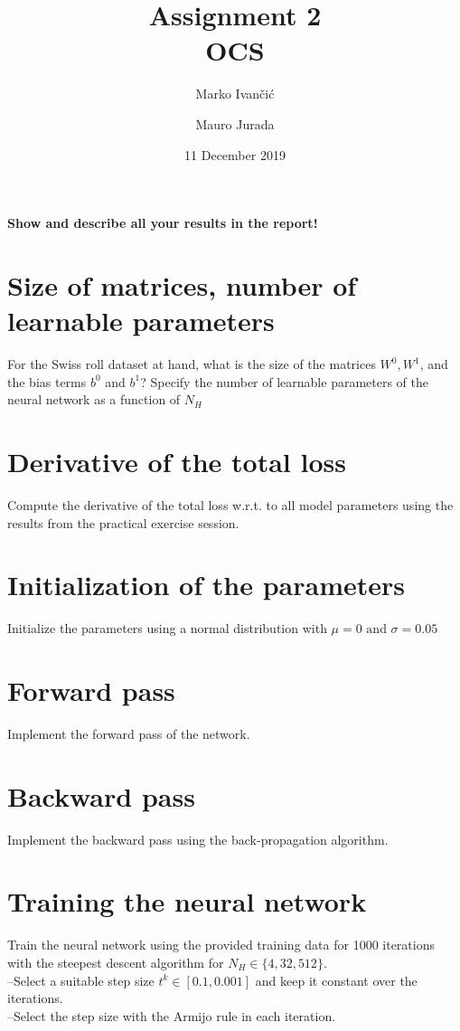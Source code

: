 \documentclass[12pt]{article}         %
\title{Assignment 2 \\ OCS}
\author{Marko Ivančić \and Mauro Jurada}
\date{11 December 2019}           %
\begin{document}
\maketitle

\textbf{Show and describe all your results in the report!}

\section{Size of matrices, number of learnable parameters}
For the Swiss roll dataset at hand, what is the size of the matrices $W^0, W^1$, and the bias terms $b^0$ and $b^1$? Specify the number of learnable parameters of the neural network as a function of $N_H$

\section{Derivative of the total loss}
Compute  the  derivative  of  the  total  loss  w.r.t.   to  all  model  parameters  using  the  results  from  the  practical exercise session.

\section{Initialization of the parameters}
Initialize the parameters using a normal distribution with $\mu= 0 \text{ and } \sigma= 0.05$

\section{Forward pass}
Implement the forward pass of the network.

\section{Backward pass}
Implement the backward pass using the back-propagation algorithm.

\section{Training the neural network}
Train the neural network using the provided training data for 1000 iterations with the steepest descent algorithm for 
$
N_H\in \{4,32,512\}
$.\\
–Select a suitable step size $t^k\in [0.1,0.001] $ and keep it constant over the iterations.\\
–Select the step size with the Armijo rule in each iteration.
\end{document}

